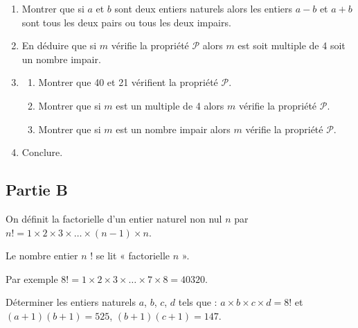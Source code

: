 \documentclass[a4paper,12pt, noSujetB]{article}
\begin{document}
\begin{enumerate}
    \item
    Montrer que si $a$ et $b$ sont deux entiers naturels alors les entiers $a - b$ et $a+b$ sont tous les deux pairs ou tous les deux impairs.
    \item
    En déduire que si $m$ vérifie la propriété $\mathcal{P}$ alors $m$ est soit multiple de 4 soit un nombre impair.
    \item
    \begin{enumerate}[label=\alph*.]
        \item
        Montrer que 40 et 21 vérifient la propriété $\mathcal{P}$.
        \item
        Montrer que si $m$ est un multiple de 4 alors $m$ vérifie la propriété $\mathcal{P}$.
        \item
        Montrer que si $m$ est un nombre impair alors $m$ vérifie la propriété $\mathcal{P}$.
    \end{enumerate}
    \item
    Conclure.
\end{enumerate}


\subsection*{Partie B}
On définit la factorielle d'un entier naturel non nul $n$ par $n ! = 1 \times 2 \times 3 \times \dots \times (n - 1) \times n$.

Le nombre entier $n$ ! se lit « factorielle $n$ ».

Par exemple $8 ! = 1 \times 2 \times 3 \times … \times 7 \times 8 = 40 320$.

\medskip
Déterminer les entiers naturels $a$, $b$, $c$, $d$ tels que :
$a \times b \times c \times d = 8 !$ et $(a + 1)(b + 1) = 525$, $(b + 1)(c + 1) = 147$.
\end{document}
